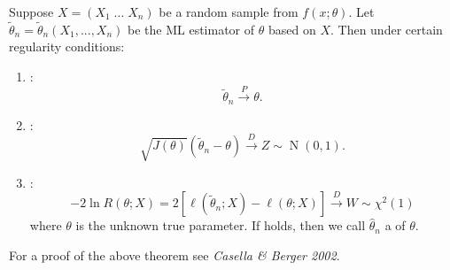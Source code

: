 \documentclass[notoc,notitlepage]{tufte-book}
\DeclareMathOperator{\Nor}{N }
\newcommand{\convd}{\overset{D}{\to}}
\newcommand{\convp}{\overset{P}{\to}}
\begin{document}
\begin{thm}
\label{thm:asymptotic_distribution_of_the_ml_estimator}
Suppose $X = (X_1 \; \hdots \; X_n)$ be a random sample from $f(x; \theta)$. Let $\tilde{\theta}_n = \tilde{\theta}_n(X_1, ..., X_n)$ be the ML estimator of $\theta$ based on $X$. Then under certain regularity conditions:
\begin{enumerate}
  \item {}:
    \begin{equation}\label{eq:consistency}
      \tilde{\theta}_n \convp \theta.
    \end{equation}
  \item {}:
    \begin{equation}\label{eq:asymptotic_normality}
      \sqrt{J(\theta)} ( \tilde{\theta}_n - \theta ) \convd Z \sim \Nor(0, 1).
    \end{equation}
  \item {}:
    \begin{equation*}
      - 2 \ln R(\theta; X) = 2 [ \ell(\tilde{\theta}_n ; X) - \ell(\theta; X) ] \convd W \sim \chi^2(1)
    \end{equation*}
    where $\theta$ is the unknown true parameter. If  holds, then we call $\hat{\theta}_n$ a  of $\theta$.
\end{enumerate}
\end{thm}

For a proof of the above theorem see \textit{Casella \& Berger 2002}\cite{CasellaBerger2002}.
\end{document}
